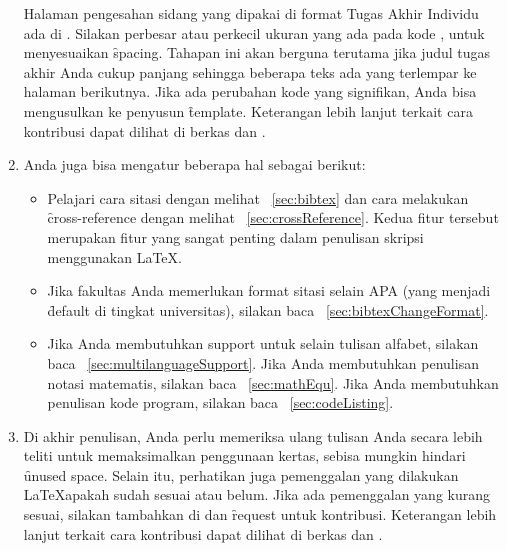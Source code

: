 \begin{enumerate}
	Halaman pengesahan sidang yang dipakai di format Tugas Akhir Individu ada di .
	Silakan perbesar atau perkecil ukuran yang ada pada kode , untuk menyesuaikan \f{spacing}.
	Tahapan ini akan berguna terutama jika judul tugas akhir Anda cukup panjang sehingga beberapa teks ada yang terlempar ke halaman berikutnya.
	Jika ada perubahan kode yang signifikan, Anda bisa mengusulkan ke penyusun \f{template}.
	Keterangan lebih lanjut terkait cara kontribusi dapat dilihat di berkas  dan .
	\item Anda juga bisa mengatur beberapa hal sebagai berikut:
	\begin{itemize}
		\item Pelajari cara sitasi dengan melihat \sect~\ref{sec:bibtex} dan cara melakukan \f{cross-reference} dengan melihat \sect~\ref{sec:crossReference}.
		Kedua fitur tersebut merupakan fitur yang sangat penting dalam penulisan skripsi menggunakan \LaTeX.
		\item Jika fakultas Anda memerlukan format sitasi selain APA (yang menjadi \f{default} di tingkat universitas), silakan baca \sect~\ref{sec:bibtexChangeFormat}.
		\item Jika Anda membutuhkan support untuk selain tulisan alfabet, silakan baca \sect~\ref{sec:multilanguageSupport}.
		Jika Anda membutuhkan penulisan notasi matematis, silakan baca \sect~\ref{sec:mathEqu}.
		Jika Anda membutuhkan penulisan kode program, silakan baca \sect~\ref{sec:codeListing}.
	\end{itemize}
	\item Di akhir penulisan, Anda perlu memeriksa ulang tulisan Anda secara lebih teliti untuk memaksimalkan penggunaan kertas, sebisa mungkin hindari \f{unused space}. Selain itu, perhatikan juga pemenggalan yang dilakukan \LaTeX apakah sudah sesuai atau belum. Jika ada pemenggalan yang kurang sesuai, silakan tambahkan di  dan \f{request} untuk kontribusi.
	Keterangan lebih lanjut terkait cara kontribusi dapat dilihat di berkas  dan .
\end{enumerate}

